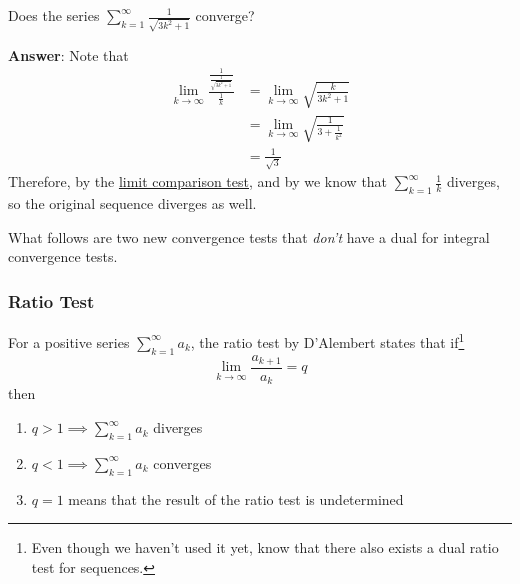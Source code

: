 \begin{exm}\label{exm-positive-series:4}
	Does the series $\sum_{k=1}^\infty \frac{1}{\sqrt{3k^2+1}}$ converge?
	\begin{flushleft}
		\textbf{Answer}: Note that
		\begin{align*}
			\lim_{k\to\infty}\frac{\frac{1}{\frac{1}{\sqrt{3k^2+1}}}}{\frac{1}{k}}
			 & = \lim_{k\to\infty}\sqrt{\frac{k}{3k^2+1}}          \\
			 & = \lim_{k\to\infty}\sqrt{\frac{1}{3+\frac{1}{k^2}}} \\
			 & =\frac{1}{\sqrt{3}}
		\end{align*}
		Therefore, by the \hyperref[thm-limit-comparison-test-series]{limit comparison test},
		and by  we know that $\sum_{k=1}^\infty\tfrac{1}{k}$
		diverges, so the original sequence diverges as well.
	\end{flushleft}
\end{exm}

\begin{rem}
	What follows are two new convergence tests that \textit{don't} have a dual for
	integral convergence tests.
\end{rem}

\subsubsection{Ratio Test}\label{subsubsec-ratio-test-series}

\begin{thm}\label{thm-ratio-test-series}
	For a positive series $\sum_{k=1}^\infty a_k$, the ratio test by D'Alembert
	states that if\footnote{Even though we haven't used it yet, know that there
		also exists a dual ratio test for sequences.}
	\begin{equation*}
		\lim_{k\to\infty}\frac{a_{k+1}}{a_k} = q
	\end{equation*}
	then
	\begin{enumerate}
		\item $q > 1 \implies \sum_{k=1}^\infty a_k$ diverges
		\item $q < 1 \implies \sum_{k=1}^\infty a_k$ converges
		\item $q = 1$ means that the result of the ratio test is undetermined
	\end{enumerate}
\end{thm}

